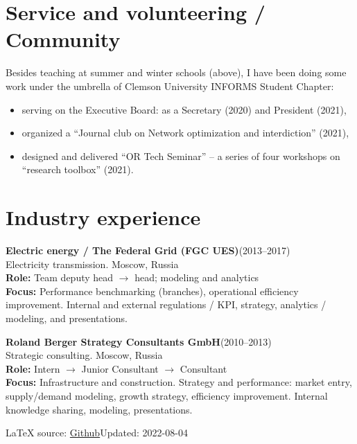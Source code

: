 \documentclass[11pt]{article} \usepackage{geometry} %
\newcommand{\jobl}[5]{%
  \textbf{#1}\hfill (#2)\\
  #3\vspace{0.25em}\\
  \textbf{Role:} #4\\
  \textbf{Focus:} #5}
\newcommand{\job}[5]{%
  \jobl{#1}{#2}{#3}{#4}{#5}\vspace{0.5em}
}
\begin{document}
   \section*{Service and volunteering / Community}
   Besides teaching at summer and winter schools (above), I have been doing some work under the umbrella of Clemson University INFORMS Student Chapter:
   \begin{itemize}
     \itemsep0pt
   \item serving on the Executive Board: as a Secretary (2020) and President
     (2021),
   \item organized a ``Journal club on Network optimization and interdiction''
     (2021),
   \item designed and delivered ``OR Tech Seminar'' -- a series of four
     workshops on ``research toolbox'' (2021).
   \end{itemize}
   \vspace{0.3em}

   \section*{Industry experience}
   \job{Electric energy / The Federal Grid (FGC UES)}{2013--2017}{Electricity transmission.
     Moscow, Russia}{Team deputy head $\rightarrow$ head; modeling and analytics}{Performance
     benchmarking (branches), operational efficiency improvement. Internal
     and external regulations / KPI, strategy, analytics / modeling, and presentations.}

   \noindent
   \job{Roland Berger Strategy Consultants GmbH}{2010--2013}{Strategic consulting.
     Moscow, Russia}{ Intern $\rightarrow$ Junior
     Consultant $\rightarrow$ Consultant}{Infrastructure and construction.
     Strategy and performance: market entry, supply/demand modeling, growth
     strategy, efficiency improvement. Internal knowledge sharing, modeling, presentations.}
   {%
   \vfill\noindent\tiny\LaTeX{} source: \href{https://github.com/alex-bochkarev/AB-CV}{Github}\hfill  Updated: 2022-08-04}
\end{document}
